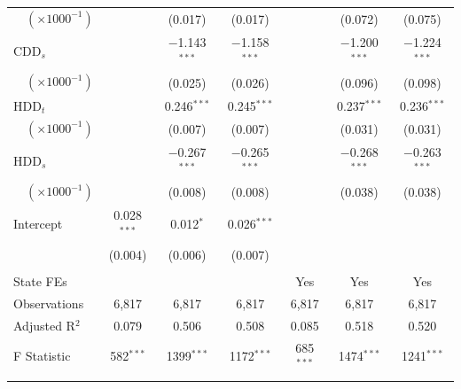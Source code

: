 \documentclass[aspectratio=169]{beamer}
\begin{document}
\begin{frame}
\begin{table}[t]
\begin{tabular}{@{\extracolsep{5pt}}lcccccc}
				$\quad(\times 1000^{-1})$ &  & (0.017) & (0.017) &  & (0.072) & (0.075) \\ 
				CDD$_s$ &  & $-$1.143$^{***}$ & $-$1.158$^{***}$ &  & $-$1.200$^{***}$ & $-$1.224$^{***}$ \\ 
				$\quad(\times 1000^{-1})$&  & (0.025) & (0.026) &  & (0.096) & (0.098) \\ 
				HDD$_t$  &  & 0.246$^{***}$ & 0.245$^{***}$ &  & 0.237$^{***}$ & 0.236$^{***}$ \\ 
				$\quad(\times 1000^{-1})$ &  & (0.007) & (0.007) &  & (0.031) & (0.031) \\ 
				HDD$_s$ &  & $-$0.267$^{***}$ & $-$0.265$^{***}$ &  & $-$0.268$^{***}$ & $-$0.263$^{***}$ \\ 
				$\quad(\times 1000^{-1})$ &  & (0.008) & (0.008) &  & (0.038) & (0.038) \\ 
				Intercept & 0.028$^{***}$ & 0.012$^{*}$ & 0.026$^{***}$ &  &  &  \\ 
				& (0.004) & (0.006) & (0.007) &  &  &  \\  [0.9ex]
				\hline \\[-1.8ex] 
				State FEs &   &   &   & Yes & Yes & Yes \\ 
				Observations & 6,817 & 6,817 & 6,817 & 6,817 & 6,817 & 6,817 \\ 
				Adjusted R$^{2}$ & 0.079 & 0.506 & 0.508 & 0.085 & 0.518 & 0.520 \\  
				F Statistic & 582$^{***}$  & 1399$^{***}$  & 1172$^{***}$ & 685$^{***}$  & 1474$^{***}$  & 1241$^{***}$  \\ [0.5ex]
				\hline 
				\hline \\[-1.8ex] 
			\end{tabular} 
		\end{table}
		
	\end{frame}
	
\end{document}
